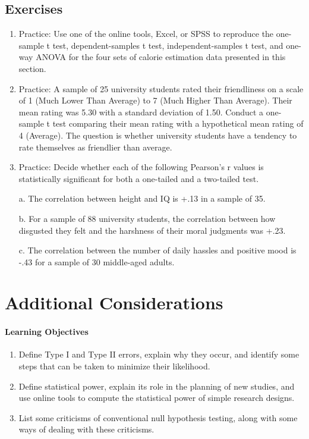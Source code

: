 \subsection{Exercises}
\begin{fullwidth}
\begin{enumerate}
\item Practice: Use one of the online tools, Excel, or SPSS to reproduce the one-sample t test, dependent-samples t test, independent-samples t test, and one-way ANOVA for the four sets of calorie estimation data presented in this section.

\item Practice: A sample of 25 university students rated their friendliness on a scale of 1 (Much Lower Than Average) to 7 (Much Higher Than Average). Their mean rating was 5.30 with a standard deviation of 1.50. Conduct a one-sample t test comparing their mean rating with a hypothetical mean rating of 4 (Average). The question is whether university students have a tendency to rate themselves as friendlier than average.

\item Practice: Decide whether each of the following Pearson's r values is statistically significant for both a one-tailed and a two-tailed test.

a. The correlation between height and IQ is +.13 in a sample of 35.

b. For a sample of 88 university students, the correlation between how disgusted they felt and the harshness of their moral judgments was +.23.

c. The correlation between the number of daily hassles and positive mood is -.43 for a sample of 30 middle-aged adults.

\end{enumerate}
\end{fullwidth}

\section{Additional Considerations}


\paragraph{Learning Objectives}
    \begin{enumerate}
    \item Define Type I and Type II errors, explain why they occur, and identify some steps that can be taken to minimize their likelihood.

    \item Define statistical power, explain its role in the planning of new studies, and use online tools to compute the statistical power of simple research designs.

    \item List some criticisms of conventional null hypothesis testing, along with some ways of dealing with these criticisms.

      \end{enumerate}


